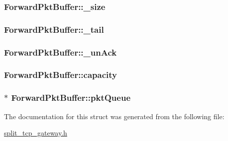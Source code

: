 \hypertarget{structForwardPktBuffer_aadbc016d1de39dcc27c95986ab945f48}{
\subsubsection[{\-\_\-size}]{ {\bf \-Forward\-Pkt\-Buffer\-::\-\_\-size}}}\label{structForwardPktBuffer_aadbc016d1de39dcc27c95986ab945f48}
\hypertarget{structForwardPktBuffer_aa46835ef263436604644e9270242ce30}{
\subsubsection[{\-\_\-tail}]{ {\bf \-Forward\-Pkt\-Buffer\-::\-\_\-tail}}}\label{structForwardPktBuffer_aa46835ef263436604644e9270242ce30}
\hypertarget{structForwardPktBuffer_a269dc529fb1924b5a93b3ebded929075}{
\subsubsection[{\-\_\-un\-Ack}]{ {\bf \-Forward\-Pkt\-Buffer\-::\-\_\-un\-Ack}}}\label{structForwardPktBuffer_a269dc529fb1924b5a93b3ebded929075}
\hypertarget{structForwardPktBuffer_ae26212d7d81169449af0050f4ba6deb3}{
\subsubsection[{capacity}]{ {\bf \-Forward\-Pkt\-Buffer\-::capacity}}}\label{structForwardPktBuffer_ae26212d7d81169449af0050f4ba6deb3}
\hypertarget{structForwardPktBuffer_a866acba6e91da3aff9ff3cfd6512cfe3}{
\subsubsection[{pkt\-Queue}]{$\ast$ {\bf \-Forward\-Pkt\-Buffer\-::pkt\-Queue}}}\label{structForwardPktBuffer_a866acba6e91da3aff9ff3cfd6512cfe3}


\-The documentation for this struct was generated from the following file\-:\begin{DoxyCompactItemize}
\item 
\hyperlink{split__tcp__gateway_8h}{split\-\_\-tcp\-\_\-gateway.\-h}\end{DoxyCompactItemize}
